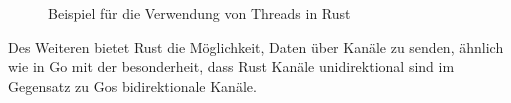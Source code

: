 \begin{figure}[htp]
    \centering
    
    \caption{Beispiel für die Verwendung von Threads in Rust}
    \label{fig:rust_threads}
\end{figure}

Des Weiteren bietet Rust die Möglichkeit, Daten über Kanäle zu senden, ähnlich
wie in Go mit der besonderheit, dass Rust Kanäle unidirektional sind im Gegensatz
zu Gos bidirektionale Kanäle. \autocite{ChannelsRustExample}
